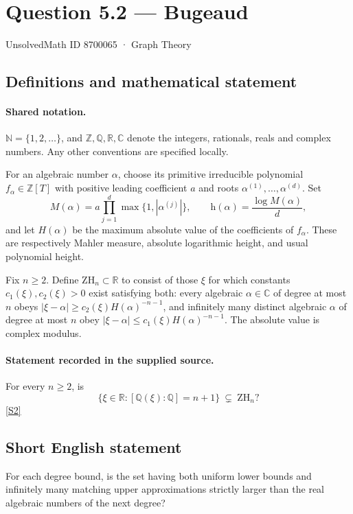 \documentclass[11pt]{article}
\newcommand{\sref}[2]{\hyperlink{source:#1:#2}{[S#2]}}
\begin{document}
\setcounter{section}{8700064}
\section{Question 5.2 — Bugeaud}\label{8700065}
{\small\sffamily UnsolvedMath ID 8700065 · Graph Theory}
\subsection{Definitions and mathematical statement}

\paragraph{Shared notation.}$\mathbb N=\{1,2,\ldots\}$, and $\mathbb Z,\mathbb Q,\mathbb R,\mathbb C$ denote the integers, rationals, reals and complex numbers. Any other conventions are specified locally.


For an algebraic number $\alpha$, choose its primitive irreducible polynomial $f_\alpha\in\mathbb Z[T]$ with positive leading coefficient $a$ and roots $\alpha^{(1)},\ldots,\alpha^{(d)}$. Set
\[
 M(\alpha)=a\prod_{j=1}^d\max\{1,|\alpha^{(j)}|\},\qquad
 \mathrm h(\alpha)=\frac{\log M(\alpha)}d,
\]
and let $H(\alpha)$ be the maximum absolute value of the coefficients of $f_\alpha$. These are respectively Mahler measure, absolute logarithmic height, and usual polynomial height.

Fix $n\ge2$. Define $\mathrm{ZH}_n\subset\mathbb R$ to consist of those $\xi$ for which constants $c_1(\xi),c_2(\xi)>0$ exist satisfying both: every algebraic $\alpha\in\mathbb C$ of degree at most $n$ obeys $|\xi-\alpha|\ge c_2(\xi)H(\alpha)^{-n-1}$, and infinitely many distinct algebraic $\alpha$ of degree at most $n$ obey $|\xi-\alpha|\le c_1(\xi)H(\alpha)^{-n-1}$. The absolute value is complex modulus.
\paragraph{Statement recorded in the supplied source.}
For every $n\ge2$, is
\[
\{\xi\in\mathbb R:[\mathbb Q(\xi):\mathbb Q]=n+1\}\ \subsetneq\ \mathrm{ZH}_n?
\] \sref{8700065}{2}

\subsection{Short English statement}
For each degree bound, is the set having both uniform lower bounds and infinitely many matching upper approximations strictly larger than the real algebraic numbers of the next degree?
\end{document}
